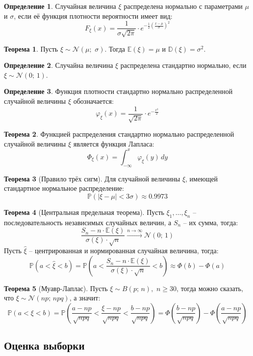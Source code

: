 \documentclass[12pt]{article}
\theoremstyle{definition}
\newtheorem{theorem}{Теорема}[section]
\newtheorem{definition}{Определение}
\newcommand{\E}{\mathbb{E}}
\newcommand{\D}{\mathbb{D}}
\newcommand{\prob}{\mathbb{P}}
\newcommand{\nd}{\mathcal{N}}
\begin{document}
\begin{definition}
    Случайная величина $\xi$ распределена нормально с параметрами $\mu$ и $\sigma$, если её функция плотности вероятности имеет вид:
    $$F_\xi(x)=\frac{1}{\sigma\sqrt{2\pi}}\cdot e^{-\frac{1}{2}\left(\frac{x-\mu}{\sigma}\right)^2}$$
\end{definition}
\begin{theorem}
    Пусть $\xi\sim\mathcal{N}(\mu;\,\,\sigma)$. Тогда $\E(\xi)=\mu$ и $\D(\xi)=\sigma^2$.
\end{theorem}
\begin{definition}
    Случайна величина $\xi$ распределена стандартно нормально, если $\xi\sim\nd(0;\,1)$.
\end{definition}
\begin{definition}
    Функция плотности стандартно нормально распределенной случайной величины $\xi$ обозначается:
    $$\varphi_\xi(x)=\frac{1}{\sqrt{2\pi}}\cdot e^{-\frac{x^2}{2}}$$
\end{definition}
\begin{theorem}
    Функцией распределения стандартно нормально распределенной случайной величины $\xi$ является функция Лапласа:
    $$\Phi_\xi(x)=\int_{-\infty}^{x}\varphi_\xi(y)\, dy $$
\end{theorem}
\begin{theorem}[Правило трёх сигм]
    Для случайной величины $\xi$, имеющей стандартное нормальное распределение:
    $$\prob(|\xi-\mu|<3\sigma)\approx\num{0.9973}$$
\end{theorem}
\begin{theorem}[Центральная предельная теорема]
    Пусть $\xi_1,\ldots,\xi_n$ – последовательность независимых случайных величин, а $S_n$ – их сумма, тогда:
    $$\frac{S_n-n\cdot \E(\xi)}{\sigma(\xi)\cdot\sqrt{n}}\xrightarrow{n\to\infty}\nd(0;\,1)$$
    Пусть $\hat{\xi}$ – центрированная и нормированная случайная величина, тогда: 
    $$\prob(a<\hat{\xi}<b)=\prob\left(a<\frac{S_n-n\cdot \E(\xi)}{\sigma(\xi)\cdot\sqrt{n}}<b\right)\approx\Phi(b)-\Phi(a)$$
\end{theorem}
\begin{theorem}[Муавр-Лаплас]
    Пусть $\xi\sim B(p;\,n),\,\,n\geq30$, тогда можно сказать, что $\xi\sim\nd(np;\,npq)$, а значит:
    $$\prob(a<\xi<b)=\prob\left(\frac{a-np}{\sqrt{npq}}<\frac{\xi-np}{\sqrt{npq}}<\frac{b-np}{\sqrt{npq}}\right)=\Phi\left(\frac{b-np}{\sqrt{npq}}\right)-\Phi\left(\frac{a-np}{\sqrt{npq}}\right)$$
\end{theorem}

\subsection{Оценка выборки}
\end{document}
